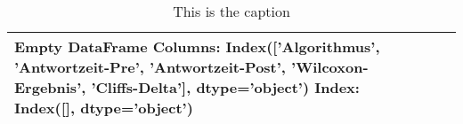 \begin{table}
\centering
\caption{This is the caption}
\label{tab:table_label}
\begin{tabular}{l|l|l|l}
\hline
Empty DataFrame
Columns: Index(['Algorithmus', 'Antwortzeit-Pre', 'Antwortzeit-Post',
       'Wilcoxon-Ergebnis', 'Cliffs-Delta'],
      dtype='object')
Index: Index([], dtype='object') \\
\hline
\end{tabular}
\end{table}

